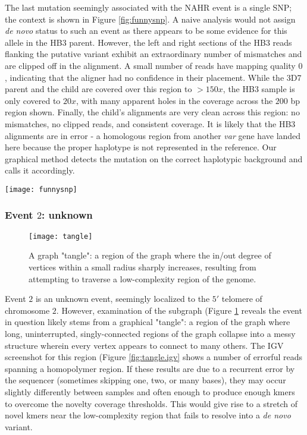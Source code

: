 The last mutation seemingly associated with the NAHR event is a single SNP; the context is shown in Figure \ref{fig:funnysnp}.  A naive analysis would not assign \textit{de novo} status to such an event as there appears to be some evidence for this allele in the HB3 parent.  However, the left and right sections of the HB3 reads flanking the putative variant exhibit an extraordinary number of mismatches and are clipped off in the alignment.  A small number of reads have mapping quality $0$, indicating that the aligner had no confidence in their placement.  While the 3D7 parent and the child are covered over this region to $> 150x$, the HB3 sample is only covered to $20x$, with many apparent holes in the coverage across the $200$ bp region shown.  Finally, the child's alignments are very clean across this region: no mismatches, no clipped reads, and consistent coverage.  It is likely that the HB3 alignments are in error - a homologous region from another \textit{var} gene have landed here because the proper haplotype is not represented in the reference.  Our graphical method detects the mutation on the correct haplotypic background and calls it accordingly.

\begin{sidewaysfigure}[h!]
  \centering
    \texttt{[image: funnysnp]}
  \caption{A \textit{de novo} SNP in a \textit{var} on the 3D7 haplotypic background.  Top panel: 3D7.  Middle: HB3.  Lower: PG0063-C child.}
  \label{fig:funnysnp}
\end{sidewaysfigure}

\subsubsection{Event $2$: unknown}

\begin{figure}[h!]
  \centering
    \texttt{[image: tangle]}
  \caption{A graph "tangle": a region of the graph where the in/out degree of vertices within a small radius sharply increases, resulting from attempting to traverse a low-complexity region of the genome.}
  \label{fig:tangle}
\end{figure}

Event $2$ is an unknown event, seemingly localized to the $5'$ telomere of chromosome $2$.  However, examination of the subgraph (Figure \ref{fig:tangle} reveals the event in question likely stems from a graphical "tangle": a region of the graph where long, uninterrupted, singly-connected regions of the graph collapse into a messy structure wherein every vertex appears to connect to many others.  The IGV screenshot for this region (Figure \ref{fig:tangle.igv} shows a number of errorful reads spanning a homopolymer region.  If these results are due to a recurrent error by the sequencer (sometimes skipping one, two, or many bases), they may occur slightly differently between samples and often enough to produce enough kmers to overcome the novelty coverage thresholds.  This would give rise to a stretch of novel kmers near the low-complexity region that fails to resolve into a \textit{de novo} variant.

